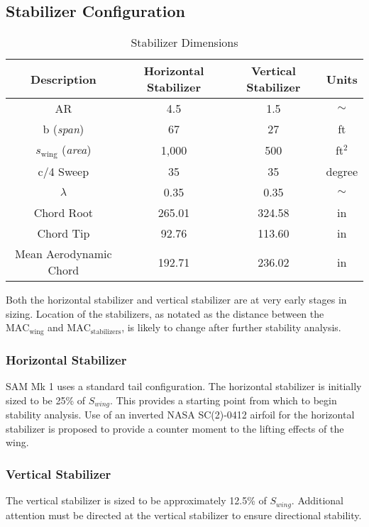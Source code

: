 \subsection{Stabilizer Configuration}

\begin{table}[!h]
    \centering
    \caption{Stabilizer Dimensions}
    \begin{tabular}{|c|c|c|c|} \toprule
        \textbf{Description} & {\textbf{Horizontal Stabilizer}} & 
        {\textbf{Vertical Stabilizer}} & \textbf{Units}\\ \midrule
        AR & 4.5 & 1.5 & $\sim$ \\ \hline
        b (\textit{span}) & 67 & 27 & ft \\ \hline 
        $s_{\text{wing}}$ (\textit{area}) & 1,000 & 500 & ft$^2$ \\ \hline
        c/4 Sweep & 35 & 35 & degree \\ \hline
        $\lambda$ & 0.35 & 0.35 & $\sim$ \\ \hline
        Chord Root & 265.01 & 324.58 & in \\ \hline
        Chord Tip & 92.76 & 113.60 & in \\ \hline   
        Mean Aerodynamic Chord & 192.71 & 236.02 & in \\ \bottomrule
    \end{tabular}
    \label{tab:wingsizing}
\end{table}

Both the horizontal stabilizer and vertical stabilizer are at very early stages in sizing.  Location of the stabilizers, as notated as the distance between the $\text{MAC}_{\text{wing}}$ and $\text{MAC}_{\text{stabilizers}}$, is likely to change after further stability analysis.

\subsubsection{Horizontal Stabilizer}
SAM  Mk 1 uses a standard tail configuration.  The horizontal stabilizer is initially sized to be 25\% of $S_{wing}$.  This provides a starting point from which to begin stability analysis.  Use of an inverted NASA SC(2)-0412 airfoil for the horizontal stabilizer is proposed to provide a counter moment to the lifting effects of the wing.

\subsubsection{Vertical Stabilizer}
The vertical stabilizer is sized to be approximately 12.5\% of $S_{wing}$.  Additional attention must be directed at the vertical stabilizer to ensure directional stability.   

